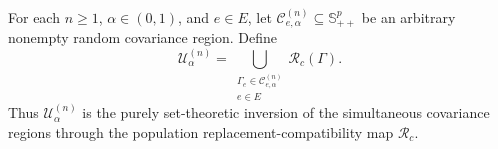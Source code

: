 For each \(n\geq1\), \(\alpha\in(0,1)\), and \(e\in E\), let \(\mathcal C^{(n)}_{e,\alpha}\subseteq\mathbb S_{++}^{p}\) be an arbitrary nonempty random covariance region. Define
\[
\mathcal U^{(n)}_{\alpha}
=\bigcup_{\substack{\Gamma_e\in\mathcal C^{(n)}_{e,\alpha}\\ e\in E}}
\mathcal R_c(\Gamma).
\]
Thus \(\mathcal U^{(n)}_{\alpha}\) is the purely set-theoretic inversion of the simultaneous covariance regions through the population replacement-compatibility map \(\mathcal R_c\).